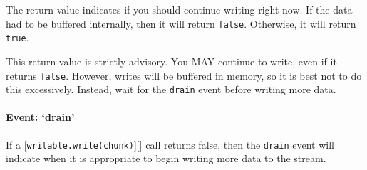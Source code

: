 The return value indicates if you should continue writing right now. If
the data had to be buffered internally, then it will return
\texttt{false}. Otherwise, it will return \texttt{true}.

This return value is strictly advisory. You MAY continue to write, even
if it returns \texttt{false}. However, writes will be buffered in
memory, so it is best not to do this excessively. Instead, wait for the
\texttt{drain} event before writing more data.

\paragraph{Event: `drain'}

If a {[}\texttt{writable.write(chunk)}{]}{[}{]} call returns false, then
the \texttt{drain} event will indicate when it is appropriate to begin
writing more data to the stream.

\begin{Shaded}
\begin{Highlighting}[]
 
   \NormalTok{;}
  \NormalTok{();}
   \NormalTok{() \{}
     \NormalTok{;}
     \NormalTok{\{}
      \NormalTok{;}
       \NormalTok{) \{}
      \NormalTok{\} } \NormalTok{\{}
      \NormalTok{\}}
    \NormalTok{\} }  
     \NormalTok{) \{}
      \NormalTok{(}\NormalTok{, }\NormalTok{);}
    \NormalTok{\}}
  \NormalTok{\}}
\NormalTok{\}}
\end{Highlighting}
\end{Shaded}


